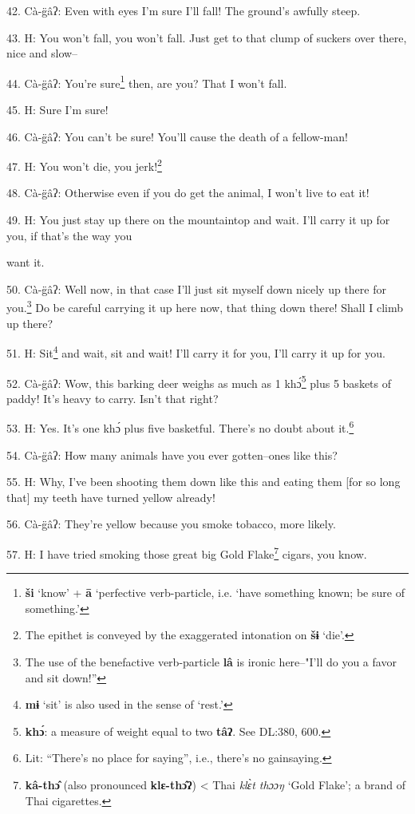 42. Cà-g̈âʔ: Even with eyes I'm sure I'll fall! The ground's awfully steep.

43. H: You won't fall, you won't fall. Just get to that clump of suckers over there,
nice and slow--

44. Cà-g̈âʔ: You're sure\footnote{\textbf{ši} `know' + \textbf{ā} `perfective verb-particle, i.e. `have something known; be sure of something.'} then, are you? That I won't fall.

45. H: Sure I'm sure!

46. Cà-g̈âʔ: You can't be sure! You'll cause the death of a fellow-man!

47. H: You won't die, you jerk!\footnote{The epithet is conveyed by the exaggerated intonation on \textbf{šɨ} `die'.}

48. Cà-g̈âʔ: Otherwise even if you do get the animal, I won't live to eat it!

49. H: You just stay up there on the mountaintop and wait. I'll carry it up for
you, if that's the way you

want it.

50. Cà-g̈âʔ: Well now, in that case I'll just sit myself down nicely up there
for you.\footnote{The use of the benefactive verb-particle \textbf{lâ} is ironic here--"I'll do you a favor and sit down!''} Do be careful carrying it up here now, that thing down there! Shall
I climb up there?

51. H: Sit\footnote{\textbf{mɨ} `sit' is also used in the sense of `rest.'} and wait, sit and wait! I'll carry it for you, I'll carry it up
for you.


52. Cà-g̈âʔ: Wow, this barking deer weighs as much as 1 khɔ́\footnote{\textbf{khɔ́}: a measure of weight equal to two \textbf{tâʔ}. See DL:380, 600.} plus 5
baskets of paddy! It's heavy to carry. Isn't that right?

53. H: Yes. It's one khɔ́ plus five basketful. There's no doubt about it.\footnote{Lit: ``There's no place for saying'', i.e., there's no gainsaying.}

54. Cà-g̈âʔ: How many animals have you ever gotten--ones like this?

55. H: Why, I've been shooting them down like this and eating them [for so long
that] my teeth have turned yellow already!

56. Cà-g̈âʔ: They're yellow because you smoke tobacco, more likely.

57. H: I have tried smoking those great big Gold Flake\footnote{\textbf{kâ-thɔ̂} (also pronounced \textbf{klɛ-thɔ̂ʔ}) < Thai\textit{ klɛ̀t thɔɔŋ} `Gold Flake'; a brand of Thai cigarettes.} cigars, you know.

